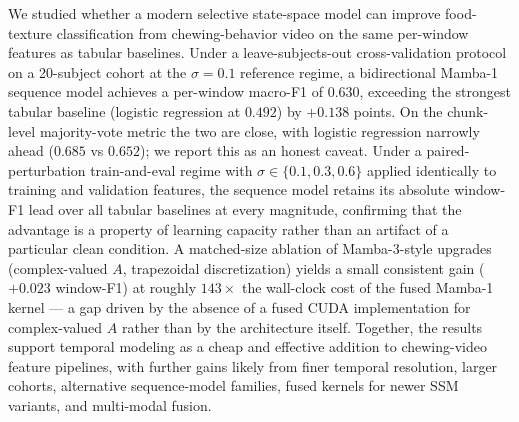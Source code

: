 \documentclass{article}
\begin{document}
We studied whether a modern selective state-space model can improve food-texture classification from chewing-behavior video on the same per-window features as tabular baselines. Under a leave-subjects-out cross-validation protocol on a 20-subject cohort at the $\sigma = 0.1$ reference regime, a bidirectional Mamba-1 sequence model achieves a per-window macro-F1 of $0.630$, exceeding the strongest tabular baseline (logistic regression at $0.492$) by $+0.138$ points. On the chunk-level majority-vote metric the two are close, with logistic regression narrowly ahead ($0.685$ vs $0.652$); we report this as an honest caveat. Under a paired-perturbation train-and-eval regime with $\sigma \in \{0.1, 0.3, 0.6\}$ applied identically to training and validation features, the sequence model retains its absolute window-F1 lead over all tabular baselines at every magnitude, confirming that the advantage is a property of learning capacity rather than an artifact of a particular clean condition. A matched-size ablation of Mamba-3-style upgrades (complex-valued $A$, trapezoidal discretization) yields a small consistent gain ($+0.023$ window-F1) at roughly $143\times$ the wall-clock cost of the fused Mamba-1 kernel --- a gap driven by the absence of a fused CUDA implementation for complex-valued $A$ rather than by the architecture itself. Together, the results support temporal modeling as a cheap and effective addition to chewing-video feature pipelines, with further gains likely from finer temporal resolution, larger cohorts, alternative sequence-model families, fused kernels for newer SSM variants, and multi-modal fusion.
\end{document}
